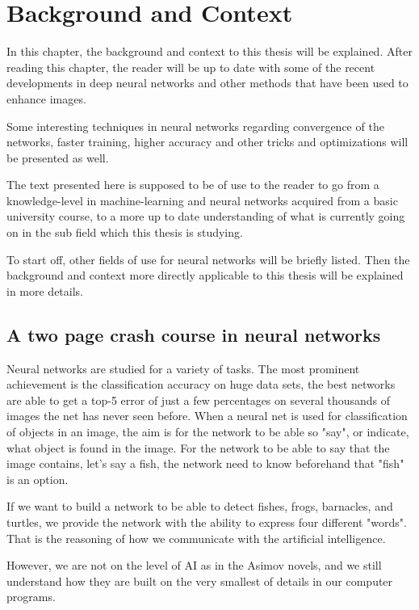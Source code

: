 \chapter{Background and Context}\label{cha:cont}

In this chapter, the background and context to this thesis will be explained. After reading this chapter, the reader will be up to date with some of the recent developments in deep neural networks and other methods that have been used to enhance images. 

Some interesting techniques in neural networks regarding convergence of the networks, faster training, higher accuracy and other tricks and optimizations will be presented as well.

The text presented here is supposed to be of use to the reader to go from a knowledge-level in machine-learning and neural networks acquired from a basic university course, to a more up to date understanding of what is currently going on in the sub field which this thesis is studying. 

To start off, other fields of use for neural networks will be briefly listed. Then the background and context more directly applicable to this thesis will be explained in more details. 

\section{A two page crash course in neural networks}
Neural networks are studied for a variety of tasks. The most prominent achievement is the classification accuracy on huge data sets, the best networks are able to get a top-5 error of just a few percentages on several thousands of images the net has never seen before. When a neural net is used for classification of objects in an image, the aim is for the network to be able so "say", or indicate, what object is found in the image. For the network to be able to say that the image contains, let's say a fish, the network need to know beforehand that "fish" is an option.

If we want to build a network to be able to detect fishes, frogs, barnacles, and turtles, we provide the network with the ability to express four different "words". That is the reasoning of how we communicate with the artificial intelligence. 

However, we are not on the level of AI as in the Asimov novels, and we still understand how they are built on the very smallest of details in our computer programs. 

